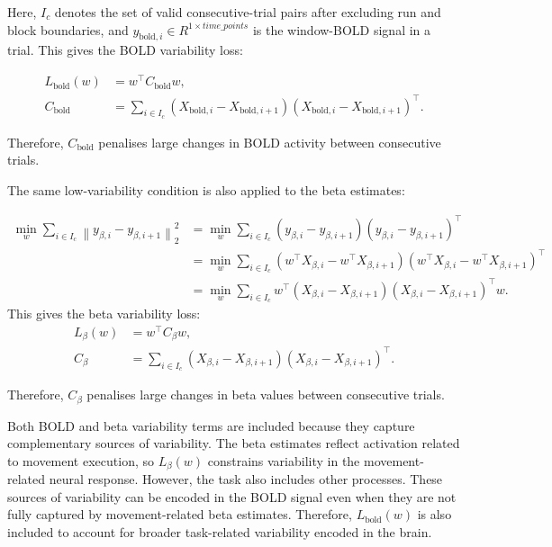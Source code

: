 \documentclass[utf8]{frontiers_suppmat}
\begin{document}
Here, $I_c$ denotes the set of valid consecutive-trial pairs after excluding run and block boundaries, and \(y_{\mathrm{bold}, i} \in R^{1 \times time\_points}\) is the window-BOLD signal in a trial. This gives the BOLD variability loss:

\begin{equation}
\begin{aligned}
L_{\mathrm{bold}}(w)
&= w^\top C_{\mathrm{bold}}w,
\\
C_{\mathrm{bold}}
&= \sum_{i\in I_c}
\left(X_{\mathrm{bold},i}-X_{\mathrm{bold},i+1}\right)
\left(X_{\mathrm{bold},i}-X_{\mathrm{bold},i+1}\right)^\top.
\end{aligned}
\end{equation}

Therefore, $C_{\mathrm{bold}}$ penalises large changes in BOLD activity between consecutive trials.

The same low-variability condition is also applied to the beta estimates:

\begin{align}
\min_w \sum_{i\in I_c}
\left\|y_{\beta,i}-y_{\beta,i+1}\right\|_2^2
&=
\min_w \sum_{i\in I_c}
\left(y_{\beta,i}-y_{\beta,i+1}\right)
\left(y_{\beta,i}-y_{\beta,i+1}\right)^\top
\nonumber\\[4pt]
&=
\min_w \sum_{i\in I_c}
\left(w^\top X_{\beta,i}-w^\top X_{\beta,i+1}\right)
\left(w^\top X_{\beta,i}-w^\top X_{\beta,i+1}\right)^\top
\nonumber\\[4pt]
&=
\min_w \sum_{i\in I_c}
w^\top
\left(X_{\beta,i}-X_{\beta,i+1}\right)
\left(X_{\beta,i}-X_{\beta,i+1}\right)^\top
w.
\end{align}
This gives the beta variability loss:
\begin{equation}
\begin{aligned}
L_{\beta}(w)
&= w^\top C_{\beta}w,
\\
C_{\beta}
&= \sum_{i\in I_c}
\left(X_{\beta,i}-X_{\beta,i+1}\right)
\left(X_{\beta,i}-X_{\beta,i+1}\right)^\top.
\end{aligned}
\end{equation}

Therefore, $C_{\beta}$ penalises large changes in beta values between consecutive trials.

Both BOLD and beta variability terms are included because they capture complementary sources of variability. The beta estimates reflect activation related to movement execution, so $L_{\beta}(w)$ constrains variability in the movement-related neural response. However, the task also includes other processes. These sources of variability can be encoded in the BOLD signal even when they are not fully captured by movement-related beta estimates. Therefore, $L_{\mathrm{bold}}(w)$ is also included to account for broader task-related variability encoded in the brain.
\end{document}
